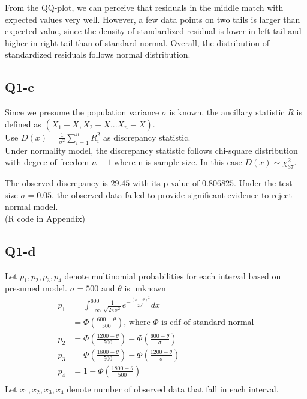 \documentclass[11pt,letterpaper]{article}
\begin{document}
\noindent From the QQ-plot, we can perceive that residuals in the middle match with expected values very well. However, a few data points on two tails is larger than expected value, since the density of standardized residual is lower in left tail and higher in right tail than of standard normal. Overall, the distribution of standardized residuals follows normal distribution. 

\subsection*{Q1-c}
\noindent Since we presume the population variance $\sigma $ is known, the ancillary statistic $R$ is defined as $(X_1 - \bar{X}, X_2 - \bar{X}...X_n - \bar{X})$. \\

\noindent Use $D(x) = \frac{1}{\sigma^2} \sum_{i=1}^{n}R_i^2$ as discrepancy statistic. \\

\noindent Under normality model, the discrepancy statistic follows chi-square distribution with degree of freedom $n-1$ where n is sample size. In this case $D(x) \sim \chi^{2}_{37}$.

\noindent The observed discrepancy is $29.45$ with its p-value of $0.806825$. Under the test size $\sigma = 0.05$, the observed data failed to provide significant evidence to reject normal model. \\

\noindent (R code in Appendix)

\subsection*{Q1-d}
\noindent Let $p_1, p_2, p_3, p_4$ denote multinomial probabilities for each interval based on presumed model. $\sigma = 500$ and $\theta$ is unknown
\begin{align*}
p_1 &= \int_{-\infty}^{600} \frac{1}{\sqrt{2 \pi \sigma^2}} e^{- \frac{(x-\theta)^2}{2 \sigma^2}} dx \\
&= \Phi (\frac{600 - \theta}{500}) \text{, where } \Phi \text{ is cdf of standard normal} \\
p_2 &= \Phi (\frac{1200 - \theta}{500}) - \Phi (\frac{600 - \theta}{\sigma}) \\
p_3 &= \Phi (\frac{1800 - \theta}{500}) - \Phi (\frac{1200 - \theta}{\sigma}) \\
p_4 &= 1 - \Phi (\frac{1800 - \theta}{500}) \\
\end{align*}
\noindent Let $x_1, x_2, x_3, x_4$ denote number of observed data that fall in each interval. \\
\end{document}
